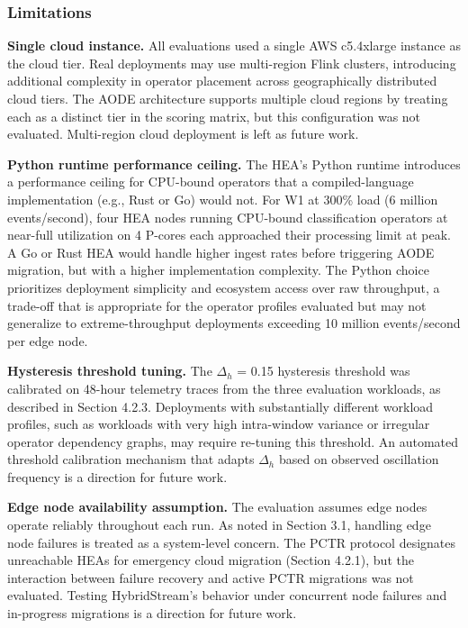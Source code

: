 \documentclass[preprint,review,12pt]{elsarticle}
\begin{document}
\subsubsection{Limitations}\label{limitations}

\textbf{Single cloud instance.} All evaluations used a single AWS c5.4xlarge instance as the cloud tier. Real deployments may use multi-region Flink clusters, introducing additional complexity in operator placement across geographically distributed cloud tiers. The AODE architecture supports multiple cloud regions by treating each as a distinct tier in the scoring matrix, but this configuration was not evaluated. Multi-region cloud deployment is left as future work.

\textbf{Python runtime performance ceiling.} The HEA's Python runtime introduces a performance ceiling for CPU-bound operators that a compiled-language implementation (e.g., Rust or Go) would not. For W1 at 300\% load (6 million events/second), four HEA nodes running CPU-bound classification operators at near-full utilization on 4 P-cores each approached their processing limit at peak. A Go or Rust HEA would handle higher ingest rates before triggering AODE migration, but with a higher implementation complexity. The Python choice prioritizes deployment simplicity and ecosystem access over raw throughput, a trade-off that is appropriate for the operator profiles evaluated but may not generalize to extreme-throughput deployments exceeding 10 million events/second per edge node.

\textbf{Hysteresis threshold tuning.} The $\Delta_h$ = 0.15 hysteresis threshold was calibrated on 48-hour telemetry traces from the three evaluation workloads, as described in Section 4.2.3. Deployments with substantially different workload profiles, such as workloads with very high intra-window variance or irregular operator dependency graphs, may require re-tuning this threshold. An automated threshold calibration mechanism that adapts $\Delta_h$ based on observed oscillation frequency is a direction for future work.

\textbf{Edge node availability assumption.} The evaluation assumes edge nodes operate reliably throughout each run. As noted in Section 3.1, handling edge node failures is treated as a system-level concern. The PCTR protocol designates unreachable HEAs for emergency cloud migration (Section 4.2.1), but the interaction between failure recovery and active PCTR migrations was not evaluated. Testing HybridStream's behavior under concurrent node failures and in-progress migrations is a direction for future work.
\end{document}
